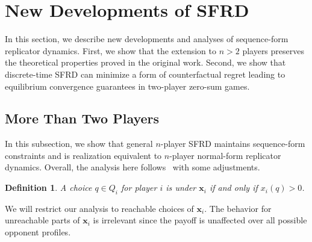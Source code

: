 \documentclass{aamas2014}
\newcommand{\bx}{\mathbf{x}}
\newcommand{\defword}[1]{\textbf{\boldmath{#1}}}
\newtheorem{definition}{Definition}
\begin{document}
\section{New Developments of SFRD}

In this section, we describe new developments and analyses of sequence-form replicator dynamics. 
First, we show that the extension to $n > 2$ players preserves the theoretical properties proved in the original work. 
Second, we show that discrete-time SFRD can minimize a form of counterfactual regret leading to equilibrium convergence guarantees
in two-player zero-sum games. 


\subsection{More Than Two Players}

In this subsection, we show that general $n$-player SFRD maintains sequence-form constraints and is 
realization equivalent to $n$-player normal-form replicator dynamics. Overall, the analysis here follows~\cite{Gatti13Efficient}
with some adjustments. 

\begin{definition}
A choice $q \in Q_i$ for player $i$ is \defword{reachable} under $\bx_i$ if and only if $x_i(q) > 0$. 
\end{definition}

We will restrict our analysis to reachable choices of $\bx_i$. The behavior for unreachable parts of $\bx_i$ is 
irrelevant since the payoff is unaffected over all possible opponent profiles. 
\end{document}
